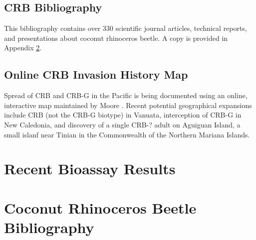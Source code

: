 \documentclass[12pt,letterpaper,english,bibliography=totocnumbered]{scrartcl}
\begin{document}
\subsection{CRB Bibliography}

This bibliography contains over 330 scientific journal articles, technical reports, and presentations about coconut rhinoceros beetle. A copy is provided in Appendix \ref{crb-bibliography}.

\subsection{Online CRB Invasion History Map}

Spread of CRB and CRB-G in the Pacific is being documented using an online, interactive map maintained by Moore \cite{moore_web_2019}. Recent potential geographical expansions include CRB (not the CRB-G biotype) in Vanuata, interception of CRB-G in New Caledonia, and discovery of a single CRB-? adult on Aguiguan Island, a small islanf near Tinian in the Commonwealth of the Northern Mariana Islands.

\newpage
\printbibliography

\newpage
\appendix
\appendixpage
\addappheadtotoc

\section{Recent Bioassay Results}\label{recent-bioassay-results}




\section{Coconut Rhinoceros Beetle Bibliography}\label{crb-bibliography}

\end{document}

